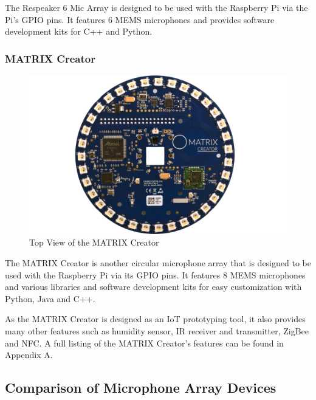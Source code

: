 \documentclass[hidelinks,12pt]{report} %
\begin{document}
The Respeaker 6 Mic Array is designed to be used with the Raspberry Pi via the Pi’s GPIO pins. It features 6 MEMS microphones and provides software development kits for C++ and Python\cite{23}. 

\subsubsection{MATRIX Creator}

\begin{figure}[h]
\centering
\includegraphics[scale = 0.2]{fig2.8} 
\caption{Top View of the MATRIX Creator}
\label{fig}
\end{figure}

The MATRIX Creator is another circular microphone array that is designed to be used with the Raspberry Pi via its GPIO pins. It features 8 MEMS microphones and various libraries and software development kits for easy customization with Python, Java and C++. 

As the MATRIX Creator is designed as an IoT prototyping tool, it also provides many other features such as humidity sensor, IR receiver and transmitter, ZigBee and NFC. A full listing of the MATRIX Creator’s features can be found in Appendix A.

\subsection{Comparison of Microphone Array Devices}
\end{document}

